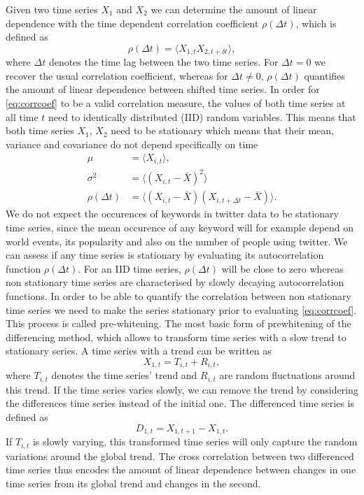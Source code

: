 \documentclass[12pt, a4paper]{article}
\begin{document}
Given two time series $X_{1}$ and $X_{2}$ we can determine the amount of linear dependence with the time dependent correlation coefficient $\rho(\Delta t)$, which is defined as
\begin{equation}
\rho(\Delta t) = \langle X_{1, t} X_{2, t+\delta t} \rangle, \label{eq:corrcoef}
\end{equation} 
where $\Delta t$ denotes the time lag between the two time series. For $\Delta t = 0$ we recover the usual correlation coefficient, whereas for $\Delta t \neq 0$, $\rho(\Delta t)$ quantifies the amount of linear dependence between shifted time series. In order for \ref{eq:corrcoef} to be a valid correlation measure, the values of both time series at all time $t$ need to identically distributed (IID) random variables. This means that both time series $X_{1}$, $X_{2}$ need to be stationary which means that their mean, variance and covariance do not depend specifically on time
\begin{align}
\mu &= \langle X_{i, t} \rangle, \\
\sigma^{2} &=  \langle (X_{i, t}-\bar{X})^{2} \rangle \\
\rho(\Delta t) &=\langle (X_{i, t}-\bar{X}) (X_{i, t+\Delta t}-\bar{X}) \rangle. 
\end{align} 
We do not expect the occurences of keywords in twitter data to be stationary time series, since the mean occurence of any keyword will for example depend on world events, its popularity and also on the number of people using twitter. We can assess if any time series is stationary by evaluating its autocorrelation function $\rho(\Delta t)$. For an IID time series, $\rho(\Delta t)$ will be close to zero whereas non stationary time series are characterised by slowly decaying autocorrelation functions.
In order to be able to quantify the correlation between non stationary time series we need to make the series stationary prior to evaluating \ref{eq:corrcoef}. This process is called pre-whitening. The most basic form of prewhitening of the differencing method, which allows to transform time series with a slow trend to stationary series. A time series with a trend can be written as
\begin{equation}
X_{1, t} = T_{i, t} + R_{i, t},
\end{equation} 
where $T_{i, t}$ denotes the time series' trend and $R_{i, t}$ are random fluctuations around this trend. If the time series varies slowly, we can remove the trend by considering the differences time series instead of the initial one. The differenced time series is defined as
\begin{equation}
D_{1, t} = X_{1, t+1}- X_{1, t}.
\end{equation} 
If $T_{i, t}$ is slowly varying, this transformed time series will only capture the random variations around the global trend. The cross correlation between two differenced time series thus encodes the amount of linear dependence between changes in one time series from its global trend and changes in the second.
\end{document}
